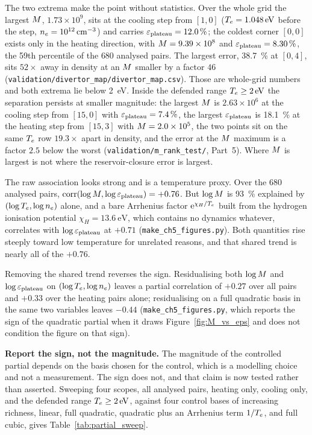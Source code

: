 The two extrema make the point without statistics. Over the whole grid the
largest $M$, $1.73\times10^{9}$, sits at the cooling step from $[1,0]$
($T_e = \SI{1.048}{\electronvolt}$ before the step,
$n_e = \SI{e12}{\per\cubic\centi\metre}$) and carries
$\varepsilon_{\mathrm{plateau}} = \SI{12.0}{\percent}$; the coldest corner $[0,0]$ exists only in
the heating direction, with $M = 9.39\times10^{8}$ and
$\varepsilon_{\mathrm{plateau}} = \SI{8.30}{\percent}$, the 59th percentile of the $680$ analysed
pairs. The largest error, \SI{38.7}{\percent} at $[0,4]$, sits $52\times$ away
in density at an $M$ smaller by a factor $46$
(\texttt{validation/divertor\_map/divertor\_map.csv}). Those are whole-grid
numbers and both extrema lie below \SI{2}{\electronvolt}. Inside the defended
range $T_e\ge\SI{2}{\electronvolt}$ the separation persists at smaller
magnitude: the largest $M$ is $2.63\times10^{6}$ at the cooling step from
$[15,0]$ with $\varepsilon_{\mathrm{plateau}} = \SI{7.4}{\percent}$, the largest $\varepsilon_{\mathrm{plateau}}$ is
\SI{18.1}{\percent} at the heating step from $[15,3]$ with
$M = 2.0\times10^{5}$, the two points sit on the same $T_e$ row
$19.3\times$ apart in density, and the error at the $M$ maximum is a factor
$2.5$ below the worst (\texttt{validation/m\_rank\_test/}, Part~5). Where
$M$ is largest is not where the reservoir-closure error is largest.

The raw association looks strong and is a temperature proxy. Over the $680$
analysed pairs, $\mathrm{corr}(\log M, \log\varepsilon_{\mathrm{plateau}}) = +0.76$. But
$\log M$ is \SI{93}{\percent} explained by $(\log T_e,\log n_e)$ alone, and a
bare Arrhenius factor $\mathrm{e}^{\chi_H/T_e}$ built from the hydrogen
ionisation potential $\chi_H = \SI{13.6}{\electronvolt}$, which contains no
dynamics whatever, correlates with $\log\varepsilon_{\mathrm{plateau}}$ at $+0.71$
(\texttt{make\_ch5\_figures.py}). Both quantities rise steeply toward low
temperature for unrelated reasons, and that shared trend is nearly all of the
$+0.76$.

Removing the shared trend reverses the sign. Residualising both $\log M$ and
$\log\varepsilon_{\mathrm{plateau}}$ on $(\log T_e,\log n_e)$ leaves a partial correlation of $+0.27$
over all pairs and $+0.33$ over the heating pairs alone; residualising on a
full quadratic basis in the same two variables leaves $-0.44$
(\texttt{make\_ch5\_figures.py}, which reports the sign of the quadratic
partial when it draws Figure~\ref{fig:M_vs_eps} and does not condition the
figure on that sign).

\textbf{Report the sign, not the magnitude.} The magnitude of the controlled
partial depends on the basis chosen for the control, which is a modelling
choice and not a measurement. The sign does not, and that claim is now tested
rather than asserted. Sweeping four scopes, all analysed pairs, heating only,
cooling only, and the defended range $T_e\ge\SI{2}{\electronvolt}$, against four
control bases of increasing richness, linear, full quadratic, quadratic plus an
Arrhenius term $1/T_e$, and full cubic, gives Table~\ref{tab:partial_sweep}.

